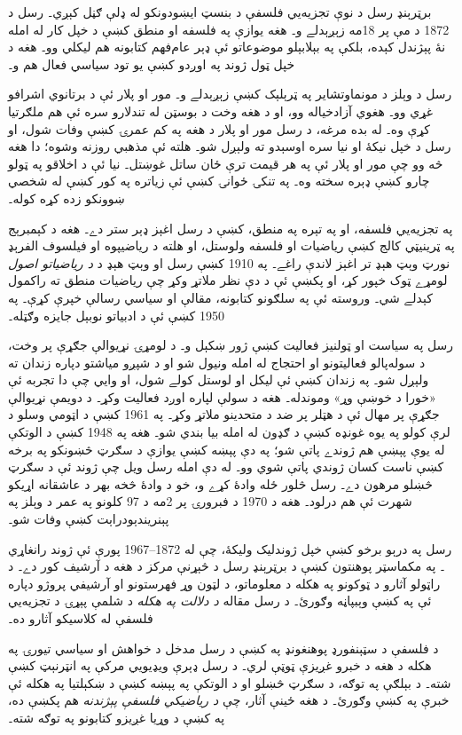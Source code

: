 \documentclass[../../../include/open-logic-section]{subfiles}
\begin{document}



برټرېنډ رسل د نوې تجزيه‌يي فلسفې د بنسټ
ايښودونکو له ډلې ګڼل کېږي۔ رسل د 1872
د مې پر 18مه زېږېدلے و۔ هغه يوازې په
فلسفه او منطق کښې د خپل کار له امله
نۀ پېژندل کېده، بلکې په بېلابېلو
موضوعاتو ئې ډېر عام‌فهم کتابونه هم
ليکلي وو۔ هغه د خپل ټول ژوند په
اوږدو کښې يو تود سياسي فعال هم و۔

رسل د وېلز د مونماوتشاير په ټرېلېک کښې
زېږېدلے و۔ مور او پلار ئې د برتانوي
اشرافو غړي وو۔ هغوي آزادخياله وو،
او د هغه وخت د بوسټن له تندلارو سره
ئې هم ملګرتيا کړې وه۔ له بده مرغه،
د رسل مور او پلار د هغه په کم عمرۍ
کښې وفات شول، او رسل د خپل نيکۀ
او نيا سره اوسېدو ته ولېږل شو۔ هلته
ئې مذهبي روزنه وشوه؛ دا هغه څه وو
چې مور او پلار ئې په هر قيمت ترې
ځان ساتل غوښتل۔ نيا ئې د اخلاقو
په ټولو چارو کښې ډېره سخته وه۔ په
تنکۍ ځوانۍ کښې ئې زياتره په کور
کښې له شخصي ښوونکو زده کړه کوله۔

په تجزيه‌يي فلسفه، او په تېره په منطق،
کښې د رسل اغېز ډېر ستر دے۔ هغه د
کېمبرېج په ټرينيټي کالج کښې رياضيات
او فلسفه ولوستل، او هلته د رياضيپوه
او فيلسوف الفرېډ نورټ وېټ هېډ تر
اغېز لاندې راغے۔ په 1910 کښې رسل
او وېټ هېډ د \emph{د رياضياتو اصول}
لومړے ټوک خپور کړ، او پکښې ئې د
دې نظر ملاتړ وکړ چې رياضيات منطق
ته راکمول کېدلے شي۔ وروسته ئې په
سلګونو کتابونه، مقالې او سياسي
رسالې خپرې کړې۔ په 1950 کښې ئې
د ادبياتو نوبېل جايزه وګټله۔

رسل په سياست او ټولنيز فعاليت کښې ژور
ښکېل و۔ د لومړۍ نړيوالې جګړې پر
وخت، د سوله‌پالو فعاليتونو او احتجاج
له امله ونيول شو او د شپږو مياشتو
دپاره زندان ته ولېږل شو۔ په زندان
کښې ئې ليکل او لوستل کولے شول،
او وايي چې دا تجربه ئې «خورا د
خوښې وړ» وموندله۔ هغه د سولې لپاره اوږد فعاليت وکړ۔ د دويمې نړيوالې جګړې پر مهال ئې د هټلر پر ضد د متحدينو ملاتړ وکړ۔ په 1961 کښې د اټومي وسلو د
لرې کولو په يوه غونډه کښې د ګډون
له امله بيا بندي شو۔ هغه په 1948
کښې د الوتکې له يوې پېښې هم ژوندے
پاتې شو؛ په دې پېښه کښې يوازې د
سګرټ څښونکو په برخه کښې ناست کسان
ژوندي پاتې شوي وو۔ له دې امله رسل
ويل چې ژوند ئې د سګرټ څښلو مرهون
دے۔ رسل څلور ځله وادۀ کړے و، خو
د وادۀ څخه بهر د عاشقانه اړيکو
شهرت ئې هم درلود۔ هغه د 1970
د فبرورۍ پر 2مه د 97 کلونو په
عمر د وېلز په پېنريندېودراېت کښې
وفات شو۔

\begin{reading}
رسل په درېو برخو کښې خپل ژوندليک
وليکۀ، چې له 1872--1967 پورې ئې
ژوند رانغاړي
\citep{Russell1967,Russell1968,Russell1969}۔
په مکماسټر پوهنتون کښې د برټرېنډ
رسل د څېړنې مرکز د هغه د آرشيف
کور دے۔ د راټولو آثارو د ټوکونو
په هکله د معلوماتو، د لټون وړ
فهرستونو او آرشيفي پروژو دپاره
ئې په \citet{Duncan2015} کښې وېبپاڼه
وګورئ۔ د رسل مقاله \emph{د دلالت
په هکله} \citep{Russell1905} د
شلمې پېړۍ د تجزيه‌يي فلسفې له
کلاسيکو آثارو ده۔

د فلسفې د سټېنفورډ پوهنغونډ په
\citep{Irvine2015} کښې د رسل مدخل
د خواهش او سياسي تيورۍ په هکله
د هغه د خبرو غږيزې ټوټې لري۔ د
رسل ډېرې ويډيويي مرکې په انټرنېټ
کښې شته۔ د بېلګې په توګه، د
سګرټ څښلو او د الوتکې په پېښه
کښې د ښکېلتيا په هکله ئې خبرې
په \citet{RussellND} کښې وګورئ۔
د هغه ځينې آثار، چې \emph{د
رياضيکي فلسفې پېژندنه} هم پکښې
ده، په \citet{LibriVoxND} کښې د
وړيا غږيزو کتابونو په توګه شته۔
\end{reading}
\end{document}
